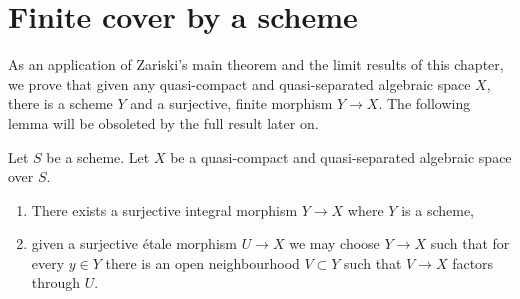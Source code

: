 \section{Finite cover by a scheme}
\label{section-finite-cover}

\noindent
As an application of Zariski's main theorem and the limit results of
this chapter, we prove that given any quasi-compact and quasi-separated
algebraic space $X$, there is a scheme $Y$ and a surjective, finite
morphism $Y \to X$. The following lemma will be obsoleted by the full
result later on.

\begin{lemma}
\label{lemma-there-is-a-scheme-integral-over}
Let $S$ be a scheme. Let $X$ be a quasi-compact and quasi-separated
algebraic space over $S$.
\begin{enumerate}
\item There exists a surjective integral morphism $Y \to X$ where $Y$
is a scheme,
\item given a surjective \'etale morphism $U \to X$ we may choose
$Y \to X$ such that for every $y \in Y$ there is an open neighbourhood
$V \subset Y$ such that $V \to X$ factors through $U$.
\end{enumerate}
\end{lemma}

